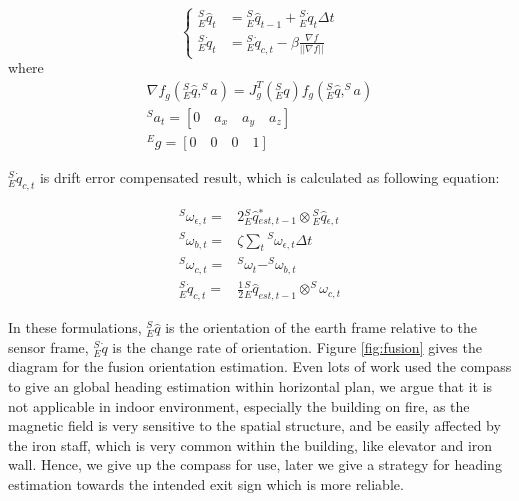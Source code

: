 \documentclass[conference]{IEEEtran}
\begin{document}
    \begin{equation}
    \left\{
    \begin{array}{rcl}
     {^{S}_{E}} \hat{q} _{t} &= {^{S}_{E}} \hat{q} _{t-1} + {^{S}_{E}} \dot{q} _{t} \Delta t \\
     {^{S}_{E}} \dot{q} _{t} &= {^{S}_{E}} \dot{q} _{c,t} - \beta \frac{\nabla f}{||\nabla f||}
    \end{array}
    \right. 
    \end{equation}
    where 
    \begin{eqnarray}
    {\nabla f}_g({^{S}_{E}} \hat{q} ,^{S}a) = J^{T}_{g}({^{S}_{E}} {q}){ f}_{g}({^{S}_{E}}\hat{q} ,^{S}a)\\
    ^{S}a_{t} = [ 0 \quad a_{x} \quad a _{y} \quad a _{z} ] \\
    ^{E}g  =  [0 \quad 0\quad 0\quad 1]
    \end{eqnarray}

    ${^{S}_{E}} \dot{q} _{c,t}$ is drift error compensated result, which is calculated as following equation:

    \begin{eqnarray}
    ^{S}\omega _{\epsilon,t} =& 2 {^{S}_{E}} \hat{q} {_{est,t-1} ^{*}}\otimes {^{S}_{E}} \hat{q} {_{\epsilon,t}}\\
    ^{S}\omega _{b,t} =& \zeta \sum_{t}{^{S}\omega _{\epsilon,t}\Delta t}\\
    ^{S}\omega _{c,t} =& ^{S}\omega _{t} - ^{S}\omega _{b,t}\\
    {^{S}_{E}} \dot{q} _{c,t} =& \frac{1}{2} {^{S}_{E}} \hat{q} _{est,t-1} \otimes ^{S}\omega _{c,t}
    \end{eqnarray}


   In these formulations, ${^{S}_{E}} \hat{q}$ is the orientation of the earth frame relative to the sensor frame, ${^{S}_{E}} \dot{q}$ is the change rate of orientation. Figure \ref{fig:fusion} gives the diagram for the fusion orientation estimation. Even lots of work used the compass to give an global heading estimation within horizontal plan, we argue that it is not applicable in indoor environment, especially the building on fire, as the magnetic field is very sensitive to the spatial structure, and be easily affected by the iron staff, which is very common within the building, like elevator and iron wall. Hence, we give up the compass for use, later we give a strategy for heading estimation towards the intended exit sign which is more reliable.
\end{document}
